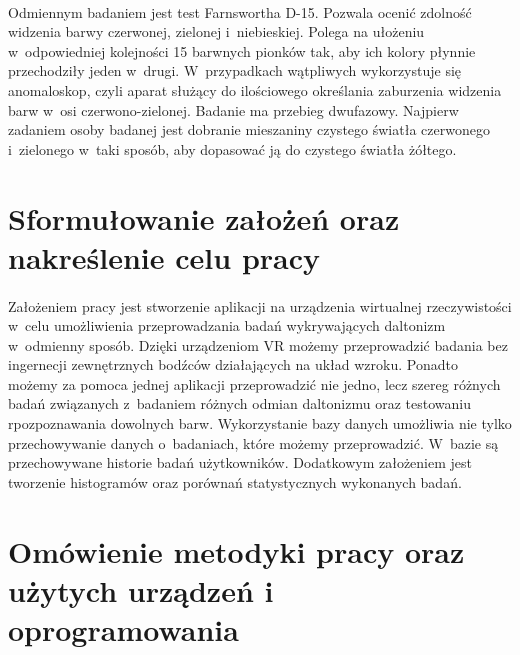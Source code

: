 \documentclass[12pt, letterpaper]{article}
\begin{document}
\newpage	

\paragraph{}
Odmiennym badaniem jest test Farnswortha D-15. Pozwala ocenić zdolność widzenia barwy czerwonej, zielonej i~niebieskiej. Polega na ułożeniu w~odpowiedniej kolejności 15 barwnych pionków tak, aby ich kolory płynnie przechodziły jeden w~drugi. W~przypadkach wątpliwych wykorzystuje się anomaloskop, czyli aparat służący do ilościowego określania zaburzenia widzenia barw w~osi czerwono-zielonej. Badanie ma przebieg dwufazowy. Najpierw zadaniem osoby badanej jest dobranie mieszaniny czystego światła czerwonego i~zielonego w~taki sposób, aby dopasować ją do czystego światła żółtego.

\newpage
\section{Sformułowanie założeń oraz nakreślenie celu pracy}
\paragraph{}
Założeniem pracy jest stworzenie aplikacji na urządzenia wirtualnej rzeczywistości w~celu umożliwienia przeprowadzania badań wykrywających daltonizm w~odmienny sposób. Dzięki urządzeniom VR możemy przeprowadzić badania bez ingernecji zewnętrznych bodźców działających na układ wzroku. Ponadto możemy za pomoca jednej aplikacji przeprowadzić nie jedno, lecz szereg różnych badań związanych z~badaniem różnych odmian daltonizmu oraz testowaniu rpozpoznawania dowolnych barw. Wykorzystanie bazy danych umożliwia nie tylko przechowywanie danych o~badaniach, które możemy przeprowadzić. W~bazie są przechowywane historie badań użytkowników. Dodatkowym założeniem jest tworzenie histogramów oraz porównań statystycznych wykonanych badań. 

\newpage
\section{Omówienie metodyki pracy oraz użytych urządzeń i oprogramowania}
\end{document}
